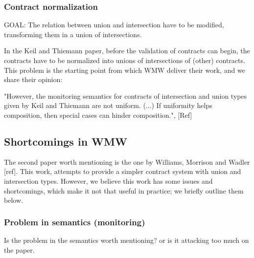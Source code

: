 \subsubsection{Contract normalization}

GOAL: The relation between union and intersection have to be modified, transforming them
in a union of intersections.

In the Keil and Thiemann paper, before the validation of contracts can begin, the
contracts have to be normalized into unions of intersections of (other) contracts.
This problem  is the starting point from which
WMW deliver their work, and we share their opinion:

"However, the monitoring semantics for contracts of intersection and union types given by Keil
and Thiemann are not uniform. (...) If uniformity helps composition, then
special cases can hinder composition.", [Ref]

\subsection{Shortcomings in WMW}

The second paper worth mentioning is the one by Williams, Morrison and Wadler [ref].
This work, attempts to provide a simpler contract system with
union and intersection types.
However, we believe this work has some issues and shortcomings, which make it
not that useful in practice; we briefly outline them below.



\subsubsection*{Problem in semantics (monitoring)}
Is the problem in the semantics worth mentioning? or is it attacking
too much on the paper.
